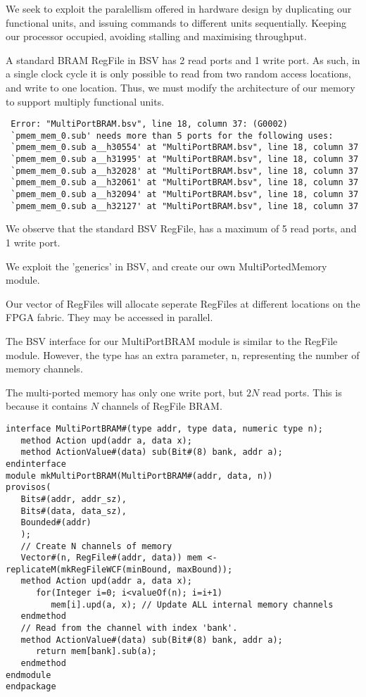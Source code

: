 \documentclass[a4paper,8pt]{report}
\begin{document}
We seek to exploit the paralellism offered in hardware design by duplicating our
functional units, and issuing commands to different units sequentially. Keeping
our processor occupied, avoiding stalling and maximising throughput.

A standard BRAM RegFile in BSV has 2 read ports and 1 write port. As such, in a
single clock cycle it is only possible to read from two random access locations,
and write to one location. Thus, we must modify the architecture of our memory
to support multiply functional units.

\scriptsize
\begin{verbatim}
 Error: "MultiPortBRAM.bsv", line 18, column 37: (G0002)
 `pmem_mem_0.sub' needs more than 5 ports for the following uses:
 `pmem_mem_0.sub a__h30554' at "MultiPortBRAM.bsv", line 18, column 37
 `pmem_mem_0.sub a__h31995' at "MultiPortBRAM.bsv", line 18, column 37
 `pmem_mem_0.sub a__h32028' at "MultiPortBRAM.bsv", line 18, column 37
 `pmem_mem_0.sub a__h32061' at "MultiPortBRAM.bsv", line 18, column 37
 `pmem_mem_0.sub a__h32094' at "MultiPortBRAM.bsv", line 18, column 37
 `pmem_mem_0.sub a__h32127' at "MultiPortBRAM.bsv", line 18, column 37
\end{verbatim}
\normalsize
We observe that the standard BSV RegFile, has a maximum of 5 read ports, and 1 write port.

We exploit the 'generics' in BSV, and create our own MultiPortedMemory module.

Our vector of RegFiles will allocate seperate RegFiles at different locations on
the FPGA fabric. They may be accessed in parallel. 

The BSV interface for our MultiPortBRAM module is similar to the RegFile module.
However, the type has an extra parameter, n, representing the number of memory
channels.

The multi-ported memory has only one write port, but $2N$ read ports. This is
because it contains $N$ channels of RegFile BRAM. 

\scriptsize
\begin{verbatim}
interface MultiPortBRAM#(type addr, type data, numeric type n);
   method Action upd(addr a, data x);
   method ActionValue#(data) sub(Bit#(8) bank, addr a);
endinterface
module mkMultiPortBRAM(MultiPortBRAM#(addr, data, n))
provisos(
   Bits#(addr, addr_sz),
   Bits#(data, data_sz),
   Bounded#(addr)
   );
   // Create N channels of memory
   Vector#(n, RegFile#(addr, data)) mem <- replicateM(mkRegFileWCF(minBound, maxBound));
   method Action upd(addr a, data x);
      for(Integer i=0; i<valueOf(n); i=i+1)
         mem[i].upd(a, x); // Update ALL internal memory channels
   endmethod
   // Read from the channel with index 'bank'.
   method ActionValue#(data) sub(Bit#(8) bank, addr a);
      return mem[bank].sub(a);
   endmethod
endmodule
endpackage
\end{verbatim}
\normalsize
\end{document}
